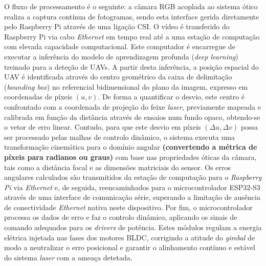 O fluxo de processamento é o seguinte: a câmara RGB acoplada ao sistema ótico realiza a captura contínua de fotogramas, sendo esta interface gerida diretamente pelo Raspberry Pi através de uma ligação \ac{CSI}. O vídeo é transferido do Raspberry Pi via cabo \emph{Ethernet} em tempo real até a uma estação de computação com elevada capacidade computacional. Este computador é encarregue de executar a inferência do modelo de aprendizagem profunda (\emph{deep learning}) treinado para a deteção de \acp{UAV}. A partir desta inferência, a posição espacial do \ac{UAV} é identificada através do centro geométrico da caixa de delimitação (\emph{bounding box}) no referencial bidimensional do plano da imagem, expresso em coordenadas de píxeis $(u, v)$. De forma a quantificar o desvio, este centro é confrontado com a coordenada de projeção do feixe \emph{laser}, previamente mapeada e calibrada em função da distância através de ensaios num fundo opaco, obtendo-se o vetor de erro linear. Contudo, para que este desvio em píxeis $(\Delta u, \Delta v)$ possa ser processado pelas malhas de controlo dinâmico, o sistema executa uma transformação cinemática para o domínio angular \textbf{(convertendo a métrica de píxeis para radianos ou graus)} com base nas propriedades óticas da câmara, tais como a distância focal e as dimensões matriciais do sensor. Os erros angulares calculados são transmitidos da estação de computação para o \emph{Raspberry Pi} via \emph{Ethernet} e, de seguida, reencaminhados para o microcontrolador ESP32-S3 através de uma interface de comunicação série, superando a limitação de ausência de conectividade \emph{Ethernet} nativa neste dispositivo. Por fim, o microcontrolador processa os dados de erro e faz o controlo dinâmico, aplicando os sinais de comando adequados para os \emph{drivers} de potência. Estes módulos regulam a energia elétrica injetada nas fases dos motores \ac{BLDC}, corrigindo a atitude do \emph{gimbal} de modo a neutralizar o erro posicional e garantir o alinhamento contínuo e estável do sistema \emph{laser} com a ameaça detetada.

